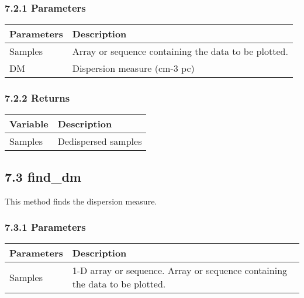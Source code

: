 \documentclass[]{article}
\begin{document}
\subsubsection{7.2.1 Parameters}\label{parameters-4}

\begin{longtable}[]{@{}ll@{}}
\toprule
Parameters & Description\tabularnewline
\midrule
\endhead
Samples & Array or sequence containing the data to be
plotted.\tabularnewline
DM & Dispersion measure (cm-3 pc)\tabularnewline
\bottomrule
\end{longtable}

\subsubsection{7.2.2 Returns}\label{returns-1}

\begin{longtable}[]{@{}ll@{}}
\toprule
Variable & Description\tabularnewline
\midrule
\endhead
Samples & Dedispersed samples\tabularnewline
\bottomrule
\end{longtable}

\subsection{7.3 find\_dm}\label{find_dm}

This method finds the dispersion measure.

\subsubsection{7.3.1 Parameters}\label{parameters-5}

\begin{longtable}[]{@{}ll@{}}
\toprule
\begin{minipage}[b]{0.41\columnwidth}\raggedright\strut
Parameters\strut
\end{minipage} & \begin{minipage}[b]{0.41\columnwidth}\raggedright\strut
Description\strut
\end{minipage}\tabularnewline
\midrule
\endhead
\begin{minipage}[t]{0.41\columnwidth}\raggedright\strut
Samples\strut
\end{minipage} & \begin{minipage}[t]{0.41\columnwidth}\raggedright\strut
1-D array or sequence. Array or sequence containing the data to be
plotted.\strut
\end{minipage}\tabularnewline
\bottomrule
\end{longtable}
\end{document}

